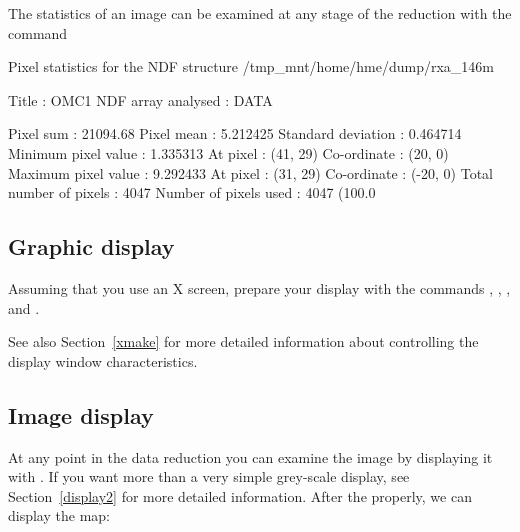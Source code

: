 \documentclass[11pt,noabs]{starlink}
\begin{document}
   The statistics of an image can be examined at any stage of the
   reduction with the command
\texttt{}

\begin{terminalv}

  Pixel statistics for the NDF structure /tmp_mnt/home/hme/dump/rxa_146m

     Title                     : OMC1
     NDF array analysed        : DATA

        Pixel sum              : 21094.68
        Pixel mean             : 5.212425
        Standard deviation     : 0.464714
        Minimum pixel value    : 1.335313
           At pixel            : (41, 29)
           Co-ordinate         : (20, 0)
        Maximum pixel value    : 9.292433
           At pixel            : (31, 29)
           Co-ordinate         : (-20, 0)
        Total number of pixels : 4047
        Number of pixels used  : 4047 (100.0%
\end{terminalv}

\subsection{\label{idset}Graphic display}

   Assuming that you use an X screen, prepare your display with the commands
\texttt{},
\texttt{},
\texttt{},
   and
\texttt{}.

\begin{terminalv}
\end{terminalv}

   See also
Section~\ref{xmake}
   for more detailed information
   about controlling the display window characteristics.

\subsection{\label{display}Image display}


   At any point in the data reduction you can examine the image
   by displaying it with
\texttt{}.
   If you want more than a very simple grey-scale
   display, see
Section~\ref{display2}
   for more detailed information.
   After the
   properly, we can display the map:
\end{document}
